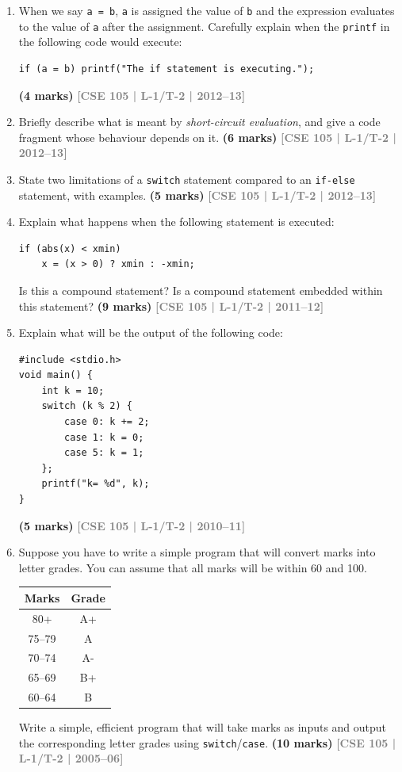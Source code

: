 \documentclass[12pt,a3paper]{article}
\newcommand{\yr}[1]{\hfill\textcolor{gray}{\small\textbf{[#1]}}}
\newcommand{\mk}[1]{\textcolor{orange!70!black}{\small\textbf{(#1 marks)}}}
\begin{document}
\begin{enumerate}
\item When we say \texttt{a = b}, \texttt{a} is assigned the value of \texttt{b} and the expression evaluates to the value of \texttt{a} after the assignment. Carefully explain when the \texttt{printf} in the following code would execute:
 
\begin{lstlisting}
if (a = b) printf("The if statement is executing.");
\end{lstlisting}
\mk{4} \yr{CSE 105 | L-1/T-2 | 2012--13}

\item Briefly describe what is meant by \textit{short-circuit evaluation}, and give a code fragment whose behaviour depends on it.
\mk{6} \yr{CSE 105 | L-1/T-2 | 2012--13}

\item State two limitations of a \texttt{switch} statement compared to an \texttt{if-else} statement, with examples.
\mk{5} \yr{CSE 105 | L-1/T-2 | 2012--13}

\item Explain what happens when the following statement is executed:
 
\begin{lstlisting}
if (abs(x) < xmin)
    x = (x > 0) ? xmin : -xmin;
\end{lstlisting}
Is this a compound statement? Is a compound statement embedded within this statement?
\mk{9} \yr{CSE 105 | L-1/T-2 | 2011--12}

\item Explain what will be the output of the following code:
 
\begin{lstlisting}
#include <stdio.h>
void main() {
    int k = 10;
    switch (k % 2) {
        case 0: k += 2;
        case 1: k = 0;
        case 5: k = 1;
    };
    printf("k= %d", k);
}
\end{lstlisting}
\mk{5} \yr{CSE 105 | L-1/T-2 | 2010--11}


\item Suppose you have to write a simple program that will convert marks into letter grades. You can assume that all marks will be within 60 and 100.
\begin{center}
  \begin{tabular}{|c|c|}
    \hline
    \textbf{Marks} & \textbf{Grade} \\ \hline
    80+   & A+ \\ \hline
    75--79 & A  \\ \hline
    70--74 & A- \\ \hline
    65--69 & B+ \\ \hline
    60--64 & B  \\ \hline
  \end{tabular}
\end{center}
Write a simple, efficient program that will take marks as inputs and output the corresponding letter grades using \texttt{switch}/\texttt{case}.
\mk{10} \yr{CSE 105 | L-1/T-2 | 2005--06}


\end{enumerate}
\end{document}
